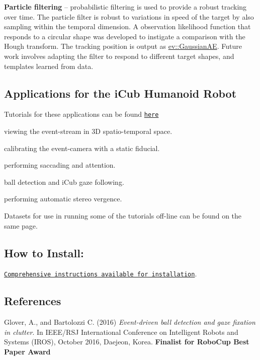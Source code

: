 \begin{DoxyItemize}
\item {\bfseries Particle filtering} -- probabilistic filtering is used to provide a robust tracking over time. The particle filter is robust to variations in speed of the target by also sampling within the temporal dimension. A observation likelihood function that responds to a circular shape was developed to instigate a comparison with the Hough transform. The tracking position is output as {\ttfamily \hyperlink{classev_1_1GaussianAE}{ev\+::\+Gaussian\+AE}}. Future work involves adapting the filter to respond to different target shapes, and templates learned from data.
\end{DoxyItemize}

\subsection*{Applications for the i\+Cub Humanoid Robot}

Tutorials for these applications can be found \href{http://robotology.github.io/event-driven/doxygen/doc/html/pages.html}{\tt here}


\begin{DoxyItemize}
\item viewing the event-\/stream in 3D spatio-\/temporal space.
\item calibrating the event-\/camera with a static fiducial.
\item performing saccading and attention.
\item ball detection and i\+Cub gaze following.
\item performing automatic stereo vergence.
\end{DoxyItemize}

Datasets for use in running some of the tutorials off-\/line can be found on the same page.

\subsection*{How to Install\+:}

\href{http://robotology.github.io/event-driven/doxygen/doc/html/pages.html}{\tt Comprehensive instructions available for installation}.

\subsection*{References}

Glover, A., and Bartolozzi C. (2016) {\itshape Event-\/driven ball detection and gaze fixation in clutter}. In I\+E\+E\+E/\+R\+SJ International Conference on Intelligent Robots and Systems (I\+R\+OS), October 2016, Daejeon, Korea. {\bfseries Finalist for Robo\+Cup Best Paper Award}

